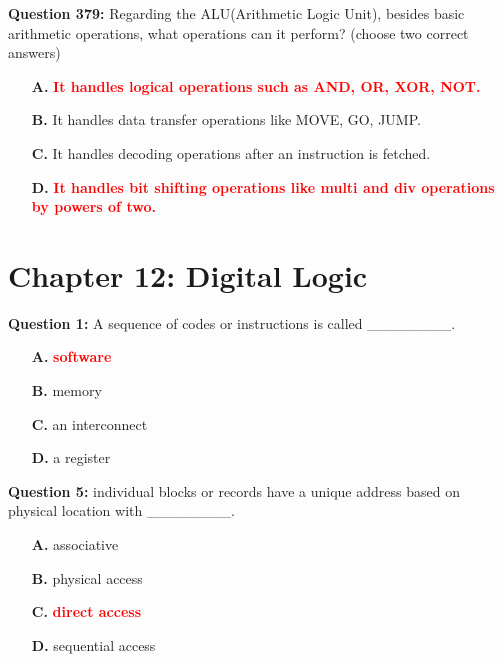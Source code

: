 \documentclass[12pt,a4paper]{article}
\begin{document}
\vspace{0.5cm}

\textbf{Question 379:} Regarding the ALU(Arithmetic Logic Unit), besides basic arithmetic operations, what operations can it perform? (choose two correct answers)

\begin{itemize}
    \item[\textbf{A.}] \textcolor{red}{\textbf{It handles logical operations such as AND, OR, XOR, NOT.}}
    \item[\textbf{B.}] It handles data transfer operations like MOVE, GO, JUMP.
    \item[\textbf{C.}] It handles decoding operations after an instruction is fetched.
    \item[\textbf{D.}] \textcolor{red}{\textbf{It handles bit shifting operations like multi and div operations by powers of two.}}
\end{itemize}

\vspace{0.5cm}

\section{Chapter 12: Digital Logic}

\textbf{Question 1:} A sequence of codes or instructions is called ________.

\begin{itemize}
    \item[\textbf{A.}] \textcolor{red}{\textbf{software}}
    \item[\textbf{B.}] memory
    \item[\textbf{C.}] an interconnect
    \item[\textbf{D.}] a register
\end{itemize}

\vspace{0.5cm}

\textbf{Question 5:} individual blocks or records have a unique address based on physical location with ________.

\begin{itemize}
    \item[\textbf{A.}] associative
    \item[\textbf{B.}] physical access
    \item[\textbf{C.}] \textcolor{red}{\textbf{direct access}}
    \item[\textbf{D.}] sequential access
\end{itemize}
\end{document}
